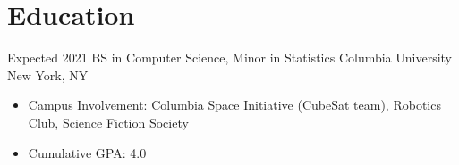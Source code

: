 \documentclass[letterpaper]{moderncv}        %
\begin{document}
\makecvtitle
\vspace*{-5mm} %
\section{Education}
\cventry
{Expected 2021}
{BS in Computer Science, Minor in Statistics}
{Columbia University}
{New York, NY}
{}
{\begin{itemize}%
	\item Campus Involvement: Columbia Space Initiative (CubeSat team), Robotics Club, Science Fiction Society
         \item Cumulative GPA: 4.0
	\end{itemize}}
\end{document}
